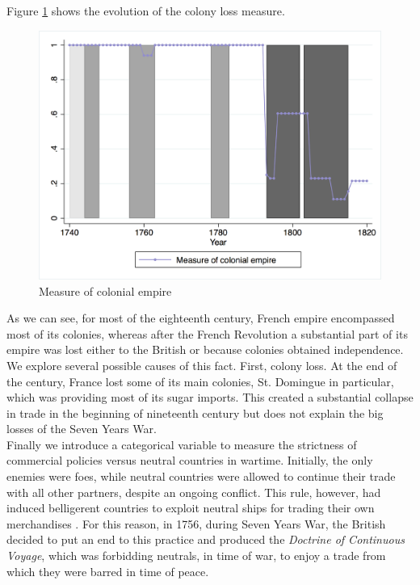 \documentclass[12pt,a4paper,notitlepage,english]{article}
\begin{document}
Figure \ref{colony_loss} shows the evolution of the colony loss measure.
\begin{center}
\begin{figure}[H]
\caption{Measure of colonial empire}
\label{colony_loss}
\centering
\includegraphics[scale=.51]{colony_loss.png}
\end{figure}
\end{center}
As we can see, for most of the eighteenth century, French empire encompassed most of its colonies, whereas after the French Revolution a substantial part of its empire was lost either to the British or because colonies obtained independence. 
We explore several possible causes of this fact.
First, colony loss.
At the end of the century, France lost some of its main colonies, St. Domingue in particular, which was providing most of its sugar imports. This created a substantial collapse in trade in the beginning of nineteenth century but does not explain the big losses of the Seven Years War.\\
Finally we introduce a categorical variable to measure the strictness of commercial policies versus neutral countries in wartime.
Initially, the only enemies were foes, while neutral countries were allowed to continue their trade with all other partners, despite an ongoing conflict.
This rule, however, had induced belligerent countries to exploit neutral ships for trading their own merchandises \citep{carriere1973negociants}.
For this reason, in 1756, during Seven Years War, the British decided to put an end to this practice and produced the \textit{Doctrine of Continuous Voyage}, which was forbidding neutrals, in time of war, to enjoy a trade from which they were barred in time of peace.
\end{document}
